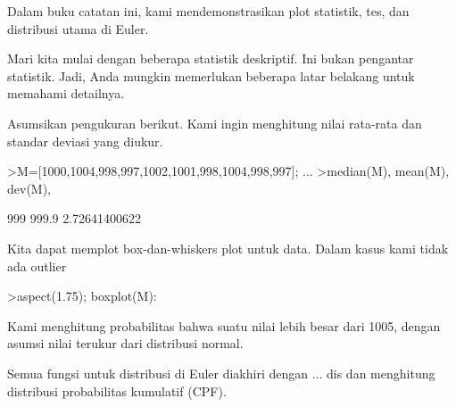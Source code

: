 \documentclass[a4paper,10pt]{article}
\begin{document}
\begin{eulernotebook}
\begin{eulercomment}
Dalam buku catatan ini, kami mendemonstrasikan plot statistik, tes,
dan distribusi utama di Euler.

Mari kita mulai dengan beberapa statistik deskriptif. Ini bukan
pengantar statistik. Jadi, Anda mungkin memerlukan beberapa latar
belakang untuk memahami detailnya.

Asumsikan pengukuran berikut. Kami ingin menghitung nilai rata-rata
dan standar deviasi yang diukur.
\end{eulercomment}
\begin{eulerprompt}
>M=[1000,1004,998,997,1002,1001,998,1004,998,997]; ...
>median(M), mean(M), dev(M),
\end{eulerprompt}
\begin{euleroutput}
  999
  999.9
  2.72641400622
\end{euleroutput}
\begin{eulercomment}
Kita dapat memplot box-dan-whiskers plot untuk data. Dalam kasus kami
tidak ada outlier
\end{eulercomment}
\begin{eulerprompt}
>aspect(1.75); boxplot(M):
\end{eulerprompt}
\begin{eulercomment}
Kami menghitung probabilitas bahwa suatu nilai lebih besar dari 1005,
dengan asumsi nilai terukur dari distribusi normal.

Semua fungsi untuk distribusi di Euler diakhiri dengan ... dis dan
menghitung distribusi probabilitas kumulatif (CPF).


\end{eulercomment}
\end{eulernotebook}
\end{document}
